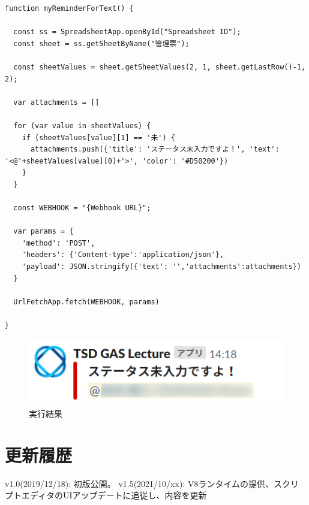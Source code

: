 \documentclass[uplatex,a4j]{jsarticle}
\begin{document}
\begin{lstlisting}[basicstyle=\ttfamily\footnotesize,frame=single,caption=Script Example for Spreadsheets practice]
function myReminderForText() {
  
  const ss = SpreadsheetApp.openById("Spreadsheet ID");
  const sheet = ss.getSheetByName("管理票");
  
  const sheetValues = sheet.getSheetValues(2, 1, sheet.getLastRow()-1, 2);
  
  var attachments = []
  
  for (var value in sheetValues) {
    if (sheetValues[value][1] == '未') {
      attachments.push({'title': 'ステータス未入力ですよ！', 'text': '<@'+sheetValues[value][0]+'>', 'color': '#D50200'})
    }
  }
  
  const WEBHOOK = "{Webhook URL}";
  
  var params = {
    'method': 'POST',
    'headers': {'Content-type':'application/json'},
    'payload': JSON.stringify({'text': '','attachments':attachments})
  }
  
  UrlFetchApp.fetch(WEBHOOK, params)

}
\end{lstlisting}

\begin{figure}[H]
 \centering
 \includegraphics[keepaspectratio, scale=0.7]{images/spreadsheet_practice_exec_example.png}
 \caption{実行結果}
 \label{fig:spreadsheet_practice_exec_example}
\end{figure}

\section{更新履歴}

v1.0(2019/12/18): 初版公開。
v1.5(2021/10/xx): V8ランタイムの提供、スクリプトエディタのUIアップデートに追従し、内容を更新
\end{document}
